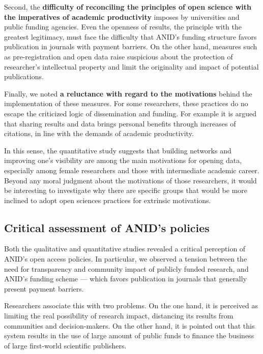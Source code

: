 \documentclass[
  letterpaper,
  DIV=11,
  numbers=noendperiod]{scrartcl}
\begin{document}
Second, the \textbf{difficulty of reconciling the principles of open
science with the imperatives of academic productivity} imposes by
universities and public funding agencies. Even the openness of results,
the principle with the greatest legitimacy, must face the difficulty
that ANID's funding structure favors publication in journals with
payment barriers. On the other hand, measures such as pre-registration
and open data raise suspicious about the protection of researcher's
intellectual property and limit the originality and impact of potential
publications.

Finally, we noted \textbf{a reluctance with regard to the motivations}
behind the implementation of these measures. For some researchers, these
practices do no escape the criticized logic of dissemination and
funding. For example it is argued that sharing results and data brings
personal benefits through increases of citations, in line with the
demands of academic productivity.

In this sense, the quantitative study suggests that building networks
and improving one's visibility are among the main motivations for
opening data, especially among female researchers and those with
intermediate academic career. Beyond any moral judgment about the
motivations of those researchers, it would be interesting to investigate
why there are specific groups that would be more inclined to adopt open
sciences practices for extrinsic motivations.

\hypertarget{critical-assessment-of-anids-policies}{%
\subsection{Critical assessment of ANID's
policies}\label{critical-assessment-of-anids-policies}}

Both the qualitative and quantitative studies revealed a critical
perception of ANID's open access policies. In particular, we observed a
tension between the need for transparency and community impact of
publicly funded research, and ANID's funding scheme --- which favors
publication in journals that generally present payment barriers.

Researchers associate this with two problems. On the one hand, it is
perceived as limiting the real possibility of research impact,
distancing its results from communities and decision-makers. On the
other hand, it is pointed out that this system results in the use of
large amount of public funds to finance the business of large
first-world scientific publishers.
\end{document}
